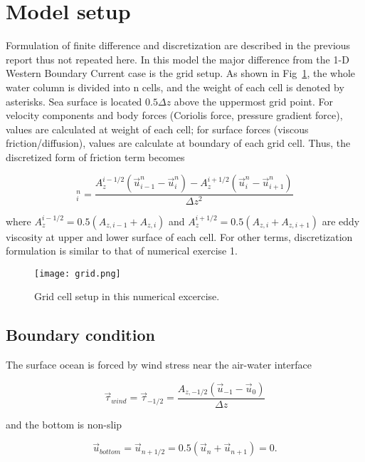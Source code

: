 \documentclass{article}
\begin{document}
\section{Model setup}
Formulation of finite difference and discretization are described in the previous report thus not repeated here. In this model the major difference from the 1-D Western Boundary Current case is the grid setup. As shown in Fig~\ref{fig:grid}, the whole water column is divided into n cells, and the weight of each cell is denoted by asterisks. Sea surface is located $0.5\Delta z$ above the uppermost grid point. For velocity components and body forces (Coriolis force, pressure gradient force), values are calculated at weight of each cell; for surface forces (viscous friction/diffusion), values are calculate at boundary of each grid cell. Thus, the discretized form of friction term becomes

\begin{equation}
[\frac{\partial}{\partial z}(A_z\frac{\partial}{\partial z}\vec{u})]_i^n=\frac{A_z^{i-1/2}(\vec{u}_{i-1}^n-\vec{u}_i^n)-A_z^{i+1/2}(\vec{u}_i^n-\vec{u}_{i+1}^n)}{\Delta z^2}
\end{equation}

where $A_z^{i-1/2}=0.5(A_{z,i-1}+A_{z,i})$ and $A_z^{i+1/2}=0.5(A_{z,i}+A_{z,i+1})$ are eddy viscosity at upper and lower surface of each cell. For other terms, discretization formulation is similar to that of numerical exercise 1.\\

\begin{figure}
  \centerline{\texttt{[image: grid.png]}}
  \caption{Grid cell setup in this numerical excercise. \citep{kampf2010advanced}}
  \label{fig:grid}
\end{figure}

\subsection{Boundary condition}
The surface ocean is forced by wind stress near the air-water interface

\begin{equation}
\vec{\tau}_{wind}=\vec{\tau}_{-1/2}=\frac{A_{z,-1/2}(\vec{u}_{-1}-\vec{u}_{0})}{\Delta z}
\end{equation}

and the bottom is non-slip

\begin{equation}
\vec{u}_{bottom}=\vec{u}_{n+1/2}=0.5(\vec{u}_n+\vec{u}_{n+1})=0.
\end{equation}
\end{document}
